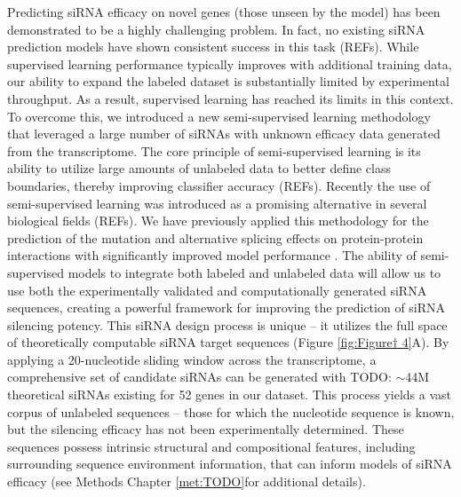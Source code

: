 \documentclass{report}
\begin{document}
Predicting siRNA efficacy on novel genes (those unseen by the model) has been demonstrated to be a highly challenging problem. In fact, no existing siRNA prediction models have shown consistent success in this task (REFs). While supervised learning performance typically improves with additional training data, our ability to expand the labeled dataset is substantially limited by experimental throughput. As a result, supervised learning has reached its limits in this context. To overcome this, we introduced a new semi-supervised learning methodology that leveraged a large number of siRNAs with unknown efficacy data generated from the transcriptome. The core principle of semi-supervised learning is its ability to utilize large amounts of unlabeled data to better define class boundaries, thereby improving classifier accuracy (REFs).
Recently the use of semi-supervised learning was introduced as a promising alternative in several biological fields (REFs). We have previously applied this methodology for the prediction of the mutation and alternative splicing effects on protein-protein interactions with significantly improved model performance \cite{narykov_predicting_2021,zhao_determining_2014}. The ability of semi-supervised models to integrate both labeled and unlabeled data will allow us to use both the experimentally validated and computationally generated siRNA sequences, creating a powerful framework for improving the prediction of siRNA silencing potency.
This siRNA design process is unique – it utilizes the full space of theoretically computable siRNA target sequences (Figure \ref{fig:Figure† 4}A). By applying a 20-nucleotide sliding window across the transcriptome, a comprehensive set of candidate siRNAs can be generated with TODO: $\sim$44M theoretical siRNAs existing for 52 genes in our dataset. This process yields a vast corpus of unlabeled sequences – those for which the nucleotide sequence is known, but the silencing efficacy has not been experimentally determined. These sequences possess intrinsic structural and compositional features, including surrounding sequence environment information, that can inform models of siRNA efficacy (see Methods Chapter \ref{met:TODO}for additional details). 
\end{document}
